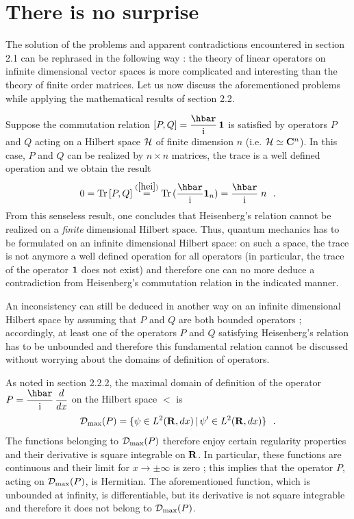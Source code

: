 \documentclass[12pt]{report}
\def\underline{\relax}
\begin{document}
 
\newpage
 
\appendix
 
 
\chapter{There is no surprise}
 
The solution of the problems and apparent contradictions 
encountered in section 2.1
can be rephrased in the following way \cite{rs}:
the theory of linear operators on infinite dimensional vector 
spaces is more complicated and interesting than the theory  
of finite order matrices. Let us now discuss   
the aforementioned problems while applying the mathematical results 
of section 2.2. 

 
\bigskip
 
\underline{{\bf (1)}}
Suppose  the commutation relation 
$[P,Q] = \ds{\hbar \over \ri} \, {\bf 1}$ is satisfied by operators 
$P$ and $Q$ acting on a Hilbert space ${\cal H}$ of finite dimension 
$n$ (i.e. ${\cal H} \simeq {\bf C}^n$). 
In this case, $P$ and $Q$ 
can be realized by $n\times n$ matrices, the trace is a 
well defined operation and we obtain the result 
\[
0 = {\rm Tr} \, [P,Q ] 
\stackrel{(\ref{hei})}{=} {\rm Tr} \, ( \ds{\hbar \over \ri}
{\bf 1}_n ) =
\ds{\hbar \over \ri}\; n
\ \ .
\]
From this senseless result,
one concludes that Heisenberg's relation
cannot be realized on a {\em finite} dimensional Hilbert space. 
Thus, quantum mechanics has to be formulated on an
infinite dimensional Hilbert space: on such a space,  
the trace is not anymore a well defined operation for all operators 
(in particular, the trace of the operator ${\bf 1}$ does not 
exist) and therefore one can no more  deduce a contradiction from 
Heisenberg's commutation relation in the indicated manner. 

An inconsistency can still be deduced in another way 
on an infinite dimensional Hilbert space 
by assuming that 
$P$ and $Q$ are both bounded operators \cite{rs};
accordingly, 
at least one of the operators $P$ and $Q$ satisfying Heisenberg's
relation has to be unbounded and therefore this fundamental relation cannot
be discussed without worrying about the domains of definition of operators. 
 
\bigskip
 
\underline{{\bf (2)}}
As noted in section 2.2.2, 
the maximal domain of definition of the operator 
$P= \ds{\hbar \over \ri} \, \ds{d \over dx}$ 
on the Hilbert space $\lt$
is
\[
{\cal D}_{\rm max} (P) = \{ \psi \in {L^2 ({{\bf R}},dx)} \, | \,
\psi^{\prime} \in {L^2 ({{\bf R}},dx)} \}
\ \ .
\]
The functions belonging to ${\cal D}_{\rm max} (P)$ therefore enjoy  
certain regularity properties and their derivative is square 
integrable on ${\bf R}$. In particular, these functions are continuous and 
their limit for $x \to \pm \infty$ 
is zero \cite{ri, bgc}; this implies that the operator $P$,
acting on ${\cal D}_{\rm max} (P)$, is Hermitian.
The aforementioned 
function, which is unbounded at infinity,  
is differentiable,
but its derivative is not square integrable and therefore 
 it does not belong to 
${\cal D}_{{\rm max}}(P)$.
\end{document}
